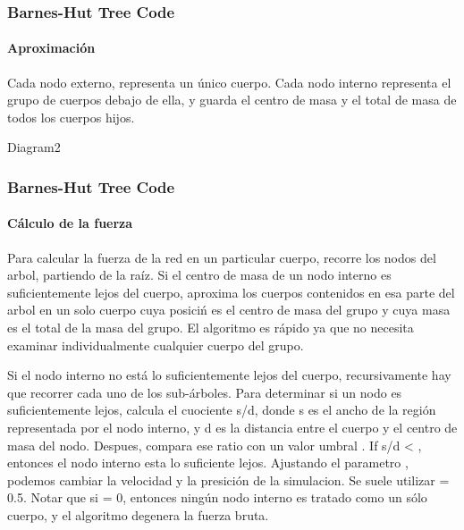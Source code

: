 \frame
{
\frametitle{Barnes-Hut Tree Code}
\framesubtitle{Aproximación}

Cada nodo externo, representa un único cuerpo.
Cada nodo interno representa el grupo de cuerpos debajo de ella,
y guarda el centro de masa y el total de masa de todos los
cuerpos hijos.

Diagram2
}


\frame
{
\frametitle{Barnes-Hut Tree Code}
\framesubtitle{Cálculo de la fuerza}

Para calcular la fuerza de la red en un particular cuerpo,
recorre los nodos del arbol, partiendo de la raíz.
Si el centro de masa de un nodo interno es suficientemente lejos
del cuerpo, aproxima los cuerpos contenidos
en esa parte del arbol en un solo cuerpo cuya posiciń es
el centro de masa del grupo y cuya masa es el total de la masa del
grupo.
El algoritmo es rápido ya que no necesita examinar individualmente
cualquier cuerpo del grupo.

Si el nodo interno no está lo suficientemente lejos del cuerpo,
recursivamente hay que recorrer cada uno de los sub-árboles.
Para determinar si un nodo es suficientemente lejos, calcula
el cuociente s/d, donde s es el ancho de la región representada
por el nodo interno, y d es la distancia entre
el cuerpo y el centro de masa del nodo.
Despues, compara ese ratio con un valor umbral \theta.
If s/d < \theta, entonces el nodo interno esta lo suficiente lejos.
Ajustando el parametro \theta, podemos cambiar la velocidad
y la presición de la simulacion.
Se suele utilizar \theta = 0.5.
Notar que si \theta = 0, entonces ningún nodo interno
es tratado como un sólo cuerpo, y el algoritmo
degenera la fuerza bruta.
}

